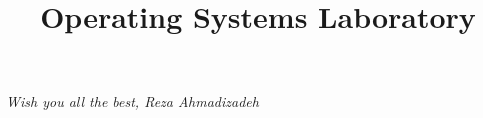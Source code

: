 

\title{Operating Systems Laboratory}





















\vfill
\textit{Wish you all the best, Reza Ahmadizadeh}
